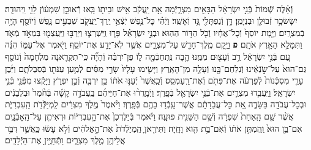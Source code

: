 \documentclass[twoside, openany, parskip=half, 11pt]{book}
\begin{document}
\begin{footnotesize}
\begin{multicols}{2}
\\
וְֿאֵ֗לֶּה שְֿׁמוֹת֙ בְּֿנֵ֣י יִשְׂרָאֵ֔ל הַבָּאִ֖ים מִצְרָ֑יְֿמָה אֵ֣ת יַֽעֲקֹ֔ב אִ֥ישׁ וּבֵית֖וֹ בָּֽאוּ׃ רְֿאוּבֵ֣ן שִׁמְע֔וֹן לֵוִ֖י וִֽיהוּדָֽה׃ יִשָּׂשׂכָ֥ר זְֿבוּלֻ֖ן וּבִנְיָמִֽן׃ דָּ֥ן וְֿנַפְתָּלִ֖י גָּ֥ד וְֿאָשֵֽׁר׃ וַיְֿהִ֗י כׇּל־נֶ֛פֶשׁ יֹֽצְֿאֵ֥י יֶֽרֶךְ־יַֽעֲקֹ֖ב שִׁבְעִ֣ים נָ֑פֶשׁ וְֿיוֹסֵ֖ף הָיָ֥ה בְֿמִצְרָֽיִם׃ וַיָּ֤מָת יוֹסֵף֙ וְֿכׇל־אֶחָ֔יו וְֿכֹ֖ל הַדּ֥וֹר הַהֽוּא׃ וּבְנֵ֣י יִשְׂרָאֵ֗ל פָּר֧וּ וַֽיִּשְׁרְצ֛וּ וַיִּרְבּ֥וּ וַיַּֽעַצְמ֖וּ בִּמְאֹ֣ד מְֿאֹ֑ד וַתִּמָּלֵ֥א הָאָ֖רֶץ אֹתָֽם׃ \textbf{פ}
וַיָּ֥קָם מֶֽלֶךְ־חָדָ֖שׁ עַל־מִצְרָ֑יִם אֲשֶׁ֥ר לֹֽא־יָדַ֖ע אֶת־יוֹסֵֽף׃ וַיֹּ֖אמֶר אֶל־עַמּ֑וֹ הִנֵּ֗ה עַ֚ם בְּֿנֵ֣י יִשְׂרָאֵ֔ל רַ֥ב וְֿעָצ֖וּם מִמֶּֽנּוּ׃ הָ֥בָה נִּֽתְחַכְּֿמָ֖ה ל֑וֹ פֶּן־יִרְבֶּ֗ה וְֿהָיָ֞ה כִּֽי־תִקְרֶ֤אנָה מִלְחָמָה֙ וְֿנוֹסַ֤ף גַּם־הוּא֙ עַל־שֹׂ֣נְֿאֵ֔ינוּ וְֿנִלְחַם־בָּ֖נוּ וְֿעָלָ֥ה מִן־הָאָֽרֶץ׃ וַיָּשִׂ֤ימוּ עָלָיו֙ שָׂרֵ֣י מִסִּ֔ים לְֿמַ֥עַן עַנֹּת֖וֹ בְּֿסִבְלֹתָ֑ם וַיִּ֜בֶן עָרֵ֤י מִסְכְּֿנוֹת֙ לְֿפַרְעֹ֔ה אֶת־פִּתֹ֖ם וְֿאֶת־רַֽעַמְסֵֽס׃ וְֿכַֽאֲשֶׁר֙ יְֿעַנּ֣וּ אֹת֔וֹ כֵּ֥ן יִרְבֶּ֖ה וְֿכֵ֣ן יִפְרֹ֑ץ וַיָּקֻ֕צוּ מִפְּֿנֵ֖י בְּֿנֵ֥י יִשְׂרָאֵֽל׃  וַיַּֽעֲבִ֧דוּ מִצְרַ֛יִם אֶת־בְּֿנֵ֥י יִשְׂרָאֵ֖ל בְּֿפָֽרֶךְ׃ וַיְֿמָֽרֲר֨וּ אֶת־חַיֵּיהֶ֜ם בַּֽעֲבֹדָ֣ה קָשָׁ֗ה בְּֿחֹ֨מֶר֙ וּבִלְבֵנִ֔ים וּבְכׇל־עֲבֹדָ֖ה בַּשָּׂדֶ֑ה אֵ֚ת כׇּל־עֲבֹ֣דָתָ֔ם אֲשֶׁר־עָֽבְֿד֥וּ בָהֶ֖ם בְּֿפָֽרֶךְ׃ וַיֹּ֨אמֶר֙ מֶ֣לֶךְ מִצְרַ֔יִם לַֽמְיַלְּֿדֹ֖ת הָֽעִבְרִיֹּ֑ת אֲשֶׁ֨ר שֵׁ֤ם הָֽאַחַת֙ שִׁפְרָ֔ה וְֿשֵׁ֥ם הַשֵּׁנִ֖ית פּוּעָֽה׃ וַיֹּ֗אמֶר בְּֿיַלֶּדְכֶן֙ אֶת־הָ֣עִבְרִיּ֔וֹת וּרְאִיתֶ֖ן עַל־הָֽאָבְֿנָ֑יִם אִם־בֵּ֥ן הוּא֙ וַֽהֲמִתֶּ֣ן אֹת֔וֹ וְֿאִם־בַּ֥ת הִ֖וא וָחָֽיָה׃ וַתִּירֶ֤אןָ הַֽמְיַלְּֿדֹת֙ אֶת־הָ֣אֱלֹהִ֔ים וְֿלֹ֣א עָשׂ֔וּ כַּֽאֲשֶׁ֛ר דִּבֶּ֥ר אֲלֵיהֶ֖ן מֶ֣לֶךְ מִצְרָ֑יִם וַתְּֿחַיֶּ֖יןָ אֶת־הַיְֿלָדִֽים׃


\end{multicols}
\end{footnotesize}
\end{document}
